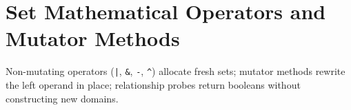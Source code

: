 \section{Set Mathematical Operators and Mutator Methods}

Non-mutating operators (\texttt{|}, \texttt{\&}, \texttt{-}, \texttt{\textasciicircum{}}) allocate fresh sets; mutator methods rewrite the left operand in place; relationship probes return booleans without constructing new domains.
